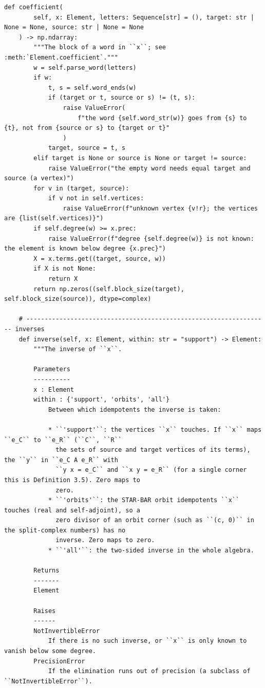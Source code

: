 \documentclass[12pt, a4paper]{report}
\theoremstyle{plain}
\theoremstyle{definition}
\theoremstyle{remark}
\theoremstyle{plain}
\begin{document}
\begin{lstlisting}[style=dsqcode]
    def coefficient(
        self, x: Element, letters: Sequence[str] = (), target: str | None = None, source: str | None = None
    ) -> np.ndarray:
        """The block of a word in ``x``; see :meth:`Element.coefficient`."""
        w = self.parse_word(letters)
        if w:
            t, s = self.word_ends(w)
            if (target or t, source or s) != (t, s):
                raise ValueError(
                    f"the word {self.word_str(w)} goes from {s} to {t}, not from {source or s} to {target or t}"
                )
            target, source = t, s
        elif target is None or source is None or target != source:
            raise ValueError("the empty word needs equal target and source (a vertex)")
        for v in (target, source):
            if v not in self.vertices:
                raise ValueError(f"unknown vertex {v!r}; the vertices are {list(self.vertices)}")
        if self.degree(w) >= x.prec:
            raise ValueError(f"degree {self.degree(w)} is not known: the element is known below degree {x.prec}")
        X = x.terms.get((target, source, w))
        if X is not None:
            return X
        return np.zeros((self.block_size(target), self.block_size(source)), dtype=complex)

    # ------------------------------------------------------------------ inverses
    def inverse(self, x: Element, within: str = "support") -> Element:
        """The inverse of ``x``.

        Parameters
        ----------
        x : Element
        within : {'support', 'orbits', 'all'}
            Between which idempotents the inverse is taken:

            * ``'support'``: the vertices ``x`` touches. If ``x`` maps ``e_C`` to ``e_R`` (``C``, ``R``
              the sets of source and target vertices of its terms), the ``y`` in ``e_C A e_R`` with
              ``y x = e_C`` and ``x y = e_R`` (for a single corner this is Definition 3.5). Zero maps to
              zero.
            * ``'orbits'``: the STAR-BAR orbit idempotents ``x`` touches (real and self-adjoint), so a
              zero divisor of an orbit corner (such as ``(c, 0)`` in the split-complex numbers) has no
              inverse. Zero maps to zero.
            * ``'all'``: the two-sided inverse in the whole algebra.

        Returns
        -------
        Element

        Raises
        ------
        NotInvertibleError
            If there is no such inverse, or ``x`` is only known to vanish below some degree.
        PrecisionError
            If the elimination runs out of precision (a subclass of ``NotInvertibleError``).


\end{lstlisting}
\end{document}

